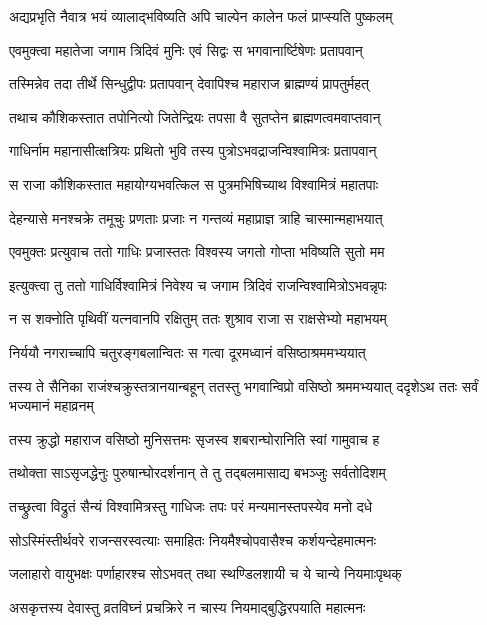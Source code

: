 \twolineshloka
{अद्यप्रभृति नैवात्र भयं व्यालाद्भविष्यति}
{अपि चाल्पेन कालेन फलं प्राप्स्यति पुष्कलम्}


\twolineshloka
{एवमुक्त्वा महातेजा जगाम त्रिदिवं मुनिः}
{एवं सिद्वः स भगवानार्ष्टिषेणः प्रतापवान्}


\twolineshloka
{तस्मिन्नेव तदा तीर्थे सिन्धुद्वीपः प्रतापवान्}
{देवापिश्च महाराज ब्राह्मण्यं प्रापतुर्महत्}


\twolineshloka
{तथाच कौशिकस्तात तपोनित्यो जितेन्द्रियः}
{तपसा वै सुतप्तेन ब्राह्मणत्वमवाप्तवान्}


\twolineshloka
{गाधिर्नाम महानासीत्क्षत्रियः प्रथितो भुवि}
{तस्य पुत्रोऽभवद्राजन्विश्वामित्रः प्रतापवान्}


\twolineshloka
{स राजा कौशिकस्तात महायोग्यभवत्किल}
{स पुत्रमभिषिच्याथ विश्वामित्रं महातपाः}


\twolineshloka
{देहन्यासे मनश्चक्रे तमूचुः प्रणताः प्रजाः}
{न गन्तव्यं महाप्राज्ञ त्राहि चास्मान्महाभयात्}


\twolineshloka
{एवमुक्तः प्रत्युवाच ततो गाधिः प्रजास्ततः}
{विश्वस्य जगतो गोप्ता भविष्यति सुतो मम}


\twolineshloka
{इत्युक्त्वा तु ततो गाधिर्विश्वामित्रं निवेश्य च}
{जगाम त्रिदिवं राजन्विश्वामित्रोऽभवन्नृपः}


\twolineshloka
{न स शक्नोति पृथिवीं यत्नवानपि रक्षितुम्}
{ततः शुश्राव राजा स राक्षसेभ्यो महाभयम्}


\twolineshloka
{निर्ययौ नगराच्चापि चतुरङ्गबलान्वितः}
{स गत्वा दूरमध्वानं वसिष्ठाश्रममभ्ययात्}


\threelineshloka
{तस्य ते सैनिका राजंश्चक्रुस्तत्रानयान्बहून्}
{ततस्तु भगवान्विप्रो वसिष्ठो श्रममभ्ययात्}
{ददृशेऽथ ततः सर्वं भज्यमानं महाव्रनम्}


\twolineshloka
{तस्य क्रुद्धो महाराज वसिष्ठो मुनिसत्तमः}
{सृजस्व शबरान्घोरानिति स्वां गामुवाच ह}


\twolineshloka
{तथोक्ता साऽसृजद्धेनुः पुरुषान्घोरदर्शनान्}
{ते तु तद्बलमासाद्य बभञ्जुः सर्वतोदिशम्}


\twolineshloka
{तच्छ्रुत्वा विद्रुतं सैन्यं विश्वामित्रस्तु गाधिजः}
{तपः परं मन्यमानस्तपस्येव मनो दधे}


\twolineshloka
{सोऽस्मिंस्तीर्थवरे राजन्सरस्वत्याः समाहितः}
{नियमैश्चोपवासैश्च कर्शयन्देहमात्मनः}


\twolineshloka
{जलाहारो वायुभक्षः पर्णाहारश्च सोऽभवत्}
{तथा स्थण्डिलशायी च ये चान्ये नियमाःपृथक्}


\twolineshloka
{असकृत्तस्य देवास्तु व्रतविघ्नं प्रचक्रिरे}
{न चास्य नियमाद्बुद्धिरपयाति महात्मनः}



